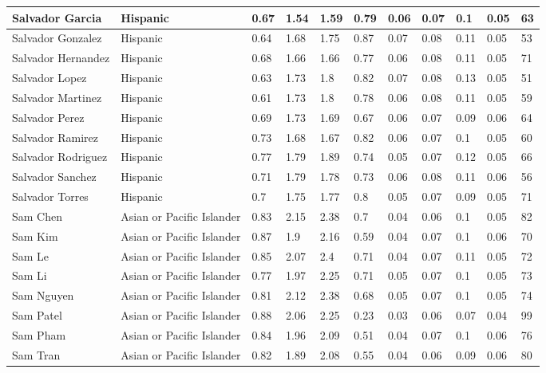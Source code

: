 \begin{table}[!ht]
\begin{tabular}{|l|l|l|l|l|l|l|l|l|l|l|}
        Salvador Garcia & Hispanic & 0.67 & 1.54 & 1.59 & 0.79 & 0.06 & 0.07 & 0.1 & 0.05 & 63 \\ \hline
        Salvador Gonzalez & Hispanic & 0.64 & 1.68 & 1.75 & 0.87 & 0.07 & 0.08 & 0.11 & 0.05 & 53 \\ \hline
        Salvador Hernandez & Hispanic & 0.68 & 1.66 & 1.66 & 0.77 & 0.06 & 0.08 & 0.11 & 0.05 & 71 \\ \hline
        Salvador Lopez & Hispanic & 0.63 & 1.73 & 1.8 & 0.82 & 0.07 & 0.08 & 0.13 & 0.05 & 51 \\ \hline
        Salvador Martinez & Hispanic & 0.61 & 1.73 & 1.8 & 0.78 & 0.06 & 0.08 & 0.11 & 0.05 & 59 \\ \hline
        Salvador Perez & Hispanic & 0.69 & 1.73 & 1.69 & 0.67 & 0.06 & 0.07 & 0.09 & 0.06 & 64 \\ \hline
        Salvador Ramirez & Hispanic & 0.73 & 1.68 & 1.67 & 0.82 & 0.06 & 0.07 & 0.1 & 0.05 & 60 \\ \hline
        Salvador Rodriguez & Hispanic & 0.77 & 1.79 & 1.89 & 0.74 & 0.05 & 0.07 & 0.12 & 0.05 & 66 \\ \hline
        Salvador Sanchez & Hispanic & 0.71 & 1.79 & 1.78 & 0.73 & 0.06 & 0.08 & 0.11 & 0.06 & 56 \\ \hline
        Salvador Torres & Hispanic & 0.7 & 1.75 & 1.77 & 0.8 & 0.05 & 0.07 & 0.09 & 0.05 & 71 \\ \hline
        Sam Chen & Asian or Pacific Islander & 0.83 & 2.15 & 2.38 & 0.7 & 0.04 & 0.06 & 0.1 & 0.05 & 82 \\ \hline
        Sam Kim & Asian or Pacific Islander & 0.87 & 1.9 & 2.16 & 0.59 & 0.04 & 0.07 & 0.1 & 0.06 & 70 \\ \hline
        Sam Le & Asian or Pacific Islander & 0.85 & 2.07 & 2.4 & 0.71 & 0.04 & 0.07 & 0.11 & 0.05 & 72 \\ \hline
        Sam Li & Asian or Pacific Islander & 0.77 & 1.97 & 2.25 & 0.71 & 0.05 & 0.07 & 0.1 & 0.05 & 73 \\ \hline
        Sam Nguyen & Asian or Pacific Islander & 0.81 & 2.12 & 2.38 & 0.68 & 0.05 & 0.07 & 0.1 & 0.05 & 74 \\ \hline
        Sam Patel & Asian or Pacific Islander & 0.88 & 2.06 & 2.25 & 0.23 & 0.03 & 0.06 & 0.07 & 0.04 & 99 \\ \hline
        Sam Pham & Asian or Pacific Islander & 0.84 & 1.96 & 2.09 & 0.51 & 0.04 & 0.07 & 0.1 & 0.06 & 76 \\ \hline
        Sam Tran & Asian or Pacific Islander & 0.82 & 1.89 & 2.08 & 0.55 & 0.04 & 0.06 & 0.09 & 0.06 & 80 \\ \hline

\end{tabular}
\end{table}
